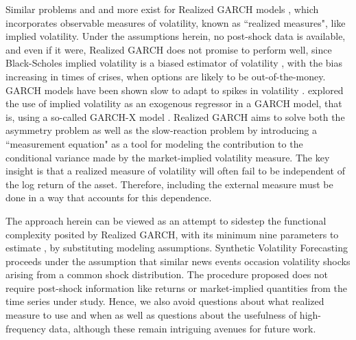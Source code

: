\documentclass[11pt]{article}
\theoremstyle{definition}
\begin{document}
Similar problems and and more exist for Realized GARCH models \citep{hansen2012realized}, which incorporates observable measures of volatility, known as  ``realized measures", like implied volatility.  Under the assumptions herein, no post-shock data is available, and even if it were, Realized GARCH does not promise to perform well, since Black-Scholes implied volatility is a biased estimator of volatility \citep{mayhew1995implied, christensen1998relation}, with the bias increasing in times of crises, when options are likely to be out-of-the-money.  GARCH models have been shown slow to adapt to spikes in volatility \citep{andersen2003modeling}.  \citet{engle2002new} explored the use of implied volatility as an exogenous regressor in a GARCH model, that is, using a so-called GARCH-X model \citep{RePEc:pra:mprapa:100301}.  Realized GARCH aims to solve both the asymmetry problem as well as the slow-reaction problem by introducing a ``measurement equation" as a tool for modeling the contribution to the conditional variance made by the market-implied volatility measure.  The key insight is that a realized measure of volatility will often fail to be independent of the log return of the asset.  Therefore, including the external measure must be done in a way that accounts for this dependence.

The approach herein can be viewed as an attempt to sidestep the functional complexity posited by Realized GARCH, with its minimum nine parameters to estimate \citep{sharma2016forecasting}, by substituting modeling assumptions.  Synthetic Volatility Forecasting proceeds under the assumption that similar news events occasion volatility shocks arising from a common shock distribution.  The procedure proposed does not require post-shock information like returns or market-implied quantities from the time series under study.  Hence, we also avoid questions about what realized measure to use and when as well as questions about the usefulness of high-frequency data, although these remain intriguing avenues for future work.
\end{document}
